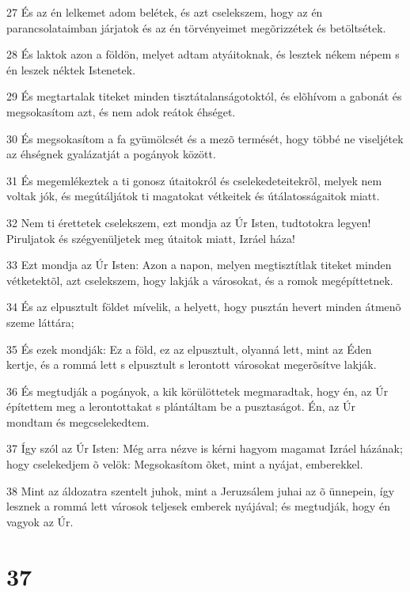 \par 27 És az én lelkemet adom belétek, és azt cselekszem, hogy az én parancsolataimban járjatok és az én törvényeimet megõrizzétek és betöltsétek.
\par 28 És laktok azon a földön, melyet adtam atyáitoknak, és lesztek nékem népem s én leszek néktek Istenetek.
\par 29 És megtartalak titeket minden tisztátalanságotoktól, és elõhívom a gabonát és megsokasítom azt, és nem adok reátok éhséget.
\par 30 És megsokasítom a fa gyümölcsét és a mezõ termését, hogy többé ne viseljétek az éhségnek gyalázatját a pogányok között.
\par 31 És megemlékeztek a ti gonosz útaitokról és cselekedeteitekrõl, melyek nem voltak jók, és megútáljátok ti magatokat vétkeitek és útálatosságaitok miatt.
\par 32 Nem ti érettetek cselekszem, ezt mondja az Úr Isten, tudtotokra legyen! Piruljatok és szégyenüljetek meg útaitok miatt, Izráel háza!
\par 33 Ezt mondja az Úr Isten: Azon a napon, melyen megtisztítlak titeket minden vétketektõl, azt cselekszem, hogy lakják a városokat, és a romok megépíttetnek.
\par 34 És az elpusztult földet mívelik, a helyett, hogy pusztán hevert minden átmenõ szeme láttára;
\par 35 És ezek mondják: Ez a föld, ez az elpusztult, olyanná lett, mint az Éden kertje, és a rommá lett s elpusztult s lerontott városokat megerõsítve lakják.
\par 36 És megtudják a pogányok, a kik körülöttetek megmaradtak, hogy én, az Úr építettem meg a lerontottakat s plántáltam be a pusztaságot. Én, az Úr mondtam és megcselekedtem.
\par 37 Így szól az Úr Isten: Még arra nézve is kérni hagyom magamat Izráel házának; hogy cselekedjem õ velök: Megsokasítom õket, mint a nyájat, emberekkel.
\par 38 Mint az áldozatra szentelt juhok, mint a Jeruzsálem juhai az õ ünnepein, így lesznek a rommá lett városok teljesek emberek nyájával; és megtudják, hogy én vagyok az Úr.

\chapter{37}

